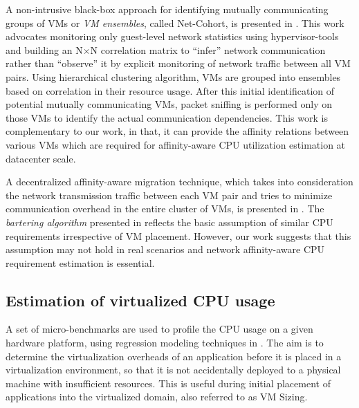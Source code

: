 A non-intrusive black-box approach for identifying mutually communicating
groups of VMs or \emph{VM ensembles}, called Net-Cohort, is presented
in \cite{net-cohort}. 
This work advocates monitoring only guest-level network statistics 
using hypervisor-tools and building an N$\times$N correlation matrix
to ``infer'' network communication rather than ``observe'' it by 
explicit monitoring of network traffic between all VM pairs.
Using hierarchical clustering algorithm, VMs are grouped into 
ensembles based on correlation in their resource usage.
After this initial identification of potential mutually communicating VMs,
packet sniffing is performed only on those VMs to identify
the actual communication dependencies. This work is complementary to
our work, in that, it can provide the affinity relations 
between various VMs which are required for 
affinity-aware CPU utilization estimation at datacenter scale.

A decentralized affinity-aware migration technique, which
takes into consideration the network transmission traffic between
each VM pair and tries to minimize communication overhead in 
the entire cluster of VMs, is presented in \cite{starling}. 
The \textit{bartering algorithm} presented
in \cite{starling} reflects the basic assumption of similar
CPU requirements irrespective of VM placement. However, our work
suggests that this assumption may not hold in real scenarios and
network affinity-aware CPU requirement estimation is essential.

\subsection{Estimation of virtualized CPU usage}
\label{cpu-estimation-refs}
A set of micro-benchmarks are used to profile the CPU 
usage on a given hardware
platform, using regression modeling techniques 
in \thinspace\cite{profiling-and-modeling}. The aim is to 
determine the virtualization overheads of an
application before it is placed in a virtualization environment,
so that it is not accidentally deployed to a physical machine with
insufficient resources. This is useful during initial placement of
applications into the virtualized domain, also referred to as VM Sizing.

